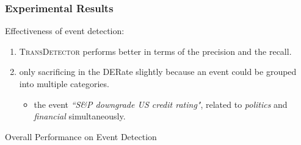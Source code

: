 \documentclass{beamer}
\begin{document}
\begin{frame}
\frametitle{Experimental Results}	
Effectiveness of event detection:
\begin{enumerate}
	\item \textsc{TransDetector} performs better in terms of the precision and the recall.
	\item only sacrificing in the DERate slightly because an event could be grouped into multiple categories.
	\begin{itemize}
		\item the event \textit{``S\&P downgrade US credit rating"}, related to \textit{politics} and  \textit{financial} simultaneously.
	\end{itemize}
\end{enumerate}

\begin{table}[h]
\setlength{\abovecaptionskip}{0.cm}%
\setlength{\belowcaptionskip}{0.cm}
\centering
\caption{Overall Performance on Event Detection}

\scriptsize
\scalebox{0.75}{
\begin{threeparttable}  


\end{threeparttable}}
\end{table}
\end{frame}
\end{document}
